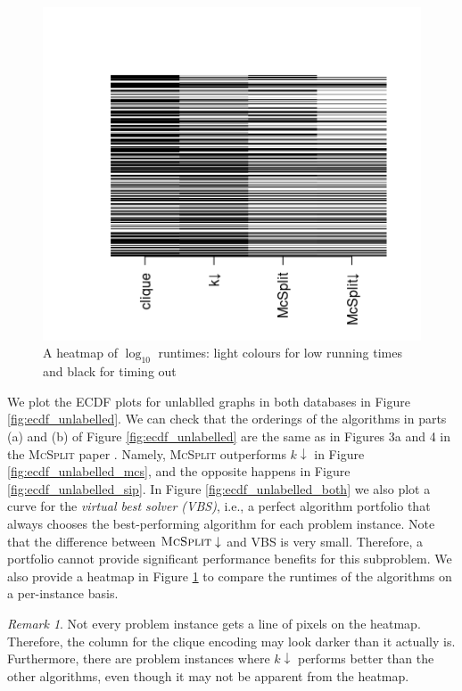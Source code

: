 \documentclass{l4proj}
\theoremstyle{definition}
\theoremstyle{remark}
\newtheorem{remark}{Remark}[chapter]
\begin{document}
\begin{figure}
  \centering
  \includegraphics{images/runtime_heatmap.png}
  \caption{A heatmap of $\log_{10}$ runtimes: light colours for low running
    times and black for timing out}
  \label{fig:runtime_heatmap}
\end{figure}

We plot the ECDF plots for unlablled graphs in both databases in Figure
\ref{fig:ecdf_unlabelled}. We can check that the orderings of the algorithms in
parts (a) and (b) of Figure \ref{fig:ecdf_unlabelled} are the same as in Figures
3a and 4 in the \textsc{McSplit} paper \cite{DBLP:conf/ijcai/McCreeshPT17}.
Namely, \textsc{McSplit} outperforms $k\downarrow$ in Figure
\ref{fig:ecdf_unlabelled_mcs}, and the opposite happens in Figure
\ref{fig:ecdf_unlabelled_sip}. In Figure \ref{fig:ecdf_unlabelled_both} we also
plot a curve for the \emph{virtual best solver (VBS)}, i.e., a perfect algorithm
portfolio that always chooses the best-performing algorithm for each problem
instance. Note that the difference between $\textsc{McSplit}\downarrow$ and VBS
is very small. Therefore, a portfolio cannot provide significant performance
benefits for this subproblem. We also provide a heatmap in Figure
\ref{fig:runtime_heatmap} to compare the runtimes of the algorithms on a
per-instance basis.

\begin{remark}
  Not every problem instance gets a line of pixels on the heatmap. Therefore,
  the column for the clique encoding may look darker than it actually is.
  Furthermore, there are problem instances where $k\downarrow$ performs better
  than the other algorithms, even though it may not be apparent from the heatmap.
\end{remark}
\end{document}
